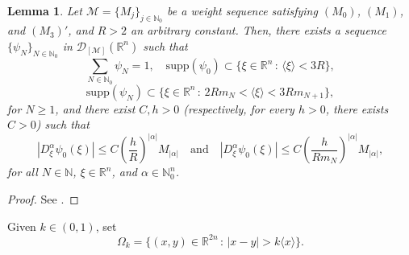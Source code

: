 \documentclass[11pt,reqno]{amsart}
\numberwithin{equation}{section}
\newtheorem{lemma}[theorem]{Lemma}
\newcommand{\R}{{\mathbb{R}}} %
\newcommand{\N}{{\mathbb{N}}} %
\newcommand{\Mj}{{\{M_j\}_{j\in\mathbb{N}_0}}} %
\newcommand{\M}{{\mathcal{M}}} %
\begin{document}
\begin{lemma}\label{lemma_partition}
	Let $\M=\Mj$ be a weight sequence satisfying $(M_0)$, $(M_1)$, and $(M_3)'$, and $R>2$ an arbitrary constant. Then, there exists a sequence $\{\psi_N\}_{N\in\N_0}$ in $\mathcal{D}_{[\M]}(\R^n)$ such that
	\begin{equation*}
		\sum_{N\in\N_0}\psi_N = 1,\quad \mathrm{supp}(\psi_0) \subset\{\xi\in\R^n\,:\, \langle\xi\rangle < 3R\},
	\end{equation*}
	\begin{equation*}
		\mathrm{supp}(\psi_N)\subset\{\xi\in\R^n\,:\, 2Rm_N < \langle\xi\rangle < 3Rm_{N+1}\},
	\end{equation*}
	for $N\geq 1$, and there exist $C,h>0$ (respectively, for every $h>0$, there exists $C>0$) such that
	\begin{equation*}
		|D_\xi^\alpha\psi_0(\xi)|\leq C\left(\frac{h}{R}\right)^{|\alpha|}M_{|\alpha|} \quad \text{and}\quad |D_\xi^\alpha\psi_0(\xi)|\leq C\left(\frac{h}{Rm_N}\right)^{|\alpha|}M_{|\alpha|},
	\end{equation*}
	for all $N\in\N$, $\xi\in\R^n$, and $\alpha\in\N_0^n$.
\end{lemma}
%
\begin{proof}
	See \cite[Lemma 6]{Pran2013}.
\end{proof}


Given $k\in (0,1)$, set
%
\begin{equation*}
	\Omega_k = \{(x,y)\in\R^{2n}\,:\,|x-y|>k\langle x\rangle\}.
\end{equation*}
\end{document}
